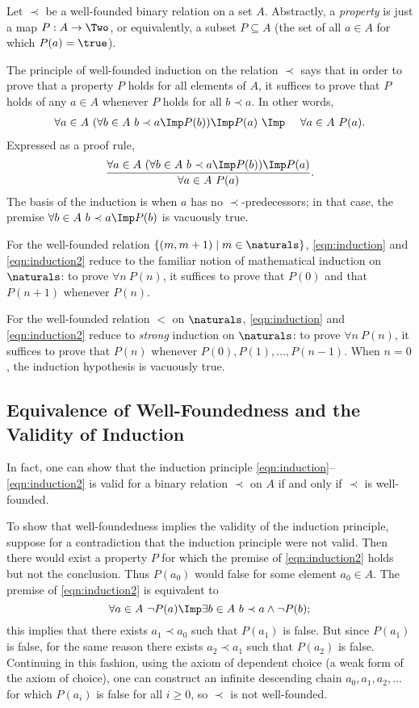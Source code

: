 Let $\prec$ be a well-founded binary relation on a set $A$. Abstractly, a \emph{property} is just a map $P:A\to\Two$, or equivalently, a subset $P\subseteq A$ (the set of all $a\in A$ for which $P(a)=\true$).

The principle of well-founded induction on the relation $\prec$ says that in order to prove that a property $P$ holds for all elements of $A$, it suffices to prove that $P$ holds of any $a\in A$ whenever $P$ holds for all $b\prec a$. In other words,
\begin{eqnarray}
\forall a\in A\ (\forall b\in A\ b\prec a\Imp P(b)) \Imp P(a) &\ \Imp\ & \forall a\in A\ P(a).\label{eqn:induction}
\end{eqnarray}
Expressed as a proof rule,
\begin{equation}
\frac{\forall a\in A\ (\forall b\in A\ b\prec a\Imp P(b)) \Imp P(a)}{\forall a\in A\ P(a)} .\label{eqn:induction2}
\end{equation}
The basis of the induction is when $a$ has no $\prec$-predecessors; in that case, the premise $\forall b\in A\ b\prec a\Imp P(b)$ is vacuously true.

For the well-founded relation $\{(m,m+1)\mid m\in\naturals\}$, \eqref{eqn:induction} and \eqref{eqn:induction2} reduce to the familiar notion of mathematical induction on $\naturals$: to prove $\forall n\ P(n)$, it suffices to prove that $P(0)$ and that $P(n+1)$ whenever $P(n)$.

For the well-founded relation $\lt$ on $\naturals$, \eqref{eqn:induction} and \eqref{eqn:induction2} reduce to \emph{strong} induction on $\naturals$: to prove $\forall n\ P(n)$, it suffices to prove that $P(n)$ whenever $P(0),P(1),\ldots,P(n-1)$. When $n = 0$, the induction hypothesis is vacuously true.

\subsection{Equivalence of Well-Foundedness and the Validity of Induction}

In fact, one can show that the induction principle \eqref{eqn:induction}--\eqref{eqn:induction2} is valid for a binary relation $\prec$ on $A$ if and only if $\prec$ is well-founded.

To show that well-foundedness implies the validity of the induction principle, suppose for a contradiction that the induction principle were not valid. Then there would exist a property $P$ for which the premise of \eqref{eqn:induction2} holds but not the conclusion. Thus $P(a_0)$ would false for some element $a_0\in A$. The premise of \eqref{eqn:induction2} is equivalent to
\[
\forall a\in A\ \neg P(a) \Imp \exists b\in A\ b\prec a\wedge \neg P(b);
\]
this implies that there exists $a_1\prec a_0$ such that $P(a_1)$ is false. But since $P(a_1)$ is false, for the same reason there exists $a_2\prec a_1$ such that $P(a_2)$ is false. Continuing in this fashion, using the axiom of dependent choice (a weak form of the axiom of choice), one can construct an infinite descending chain $a_0,a_1,a_2,\ldots$ for which $P(a_i)$ is false for all $i\geq 0$, so $\prec$ is not well-founded.

